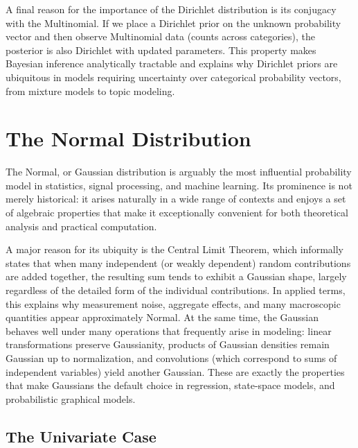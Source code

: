 A final reason for the importance of the Dirichlet distribution is its \alert{conjugacy} with the Multinomial. If we place a Dirichlet prior on the unknown probability vector and then observe Multinomial data (counts across categories), the posterior is also Dirichlet with updated parameters. This property makes Bayesian inference analytically tractable and explains why Dirichlet priors are ubiquitous in models requiring uncertainty over categorical probability vectors, from mixture models to topic modeling.


\section*{The Normal Distribution}

The \alert{Normal}, or \alert{Gaussian} distribution is arguably the most influential probability model in statistics, signal processing, and machine learning. Its prominence is not merely historical: it arises naturally in a wide range of contexts and enjoys a set of algebraic properties that make it exceptionally convenient for both theoretical analysis and practical computation.

A major reason for its ubiquity is the \alert{Central Limit Theorem}, which informally states that when many independent (or weakly dependent) random contributions are added together, the resulting sum tends to exhibit a Gaussian shape, largely regardless of the detailed form of the individual contributions. In applied terms, this explains why measurement noise, aggregate effects, and many macroscopic quantities appear approximately Normal. At the same time, the Gaussian behaves well under many operations that frequently arise in modeling: linear transformations preserve Gaussianity, products of Gaussian densities remain Gaussian up to normalization, and convolutions (which correspond to sums of independent variables) yield another Gaussian. These are exactly the properties that make Gaussians the default choice in regression, state-space models, and probabilistic graphical models.

\subsection*{The Univariate Case}

